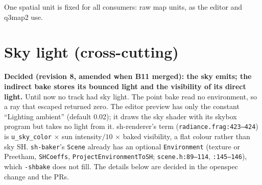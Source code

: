 \documentclass[11pt,a4paper]{article}
\begin{document}
\vspace{4pt}
One spatial unit is fixed for all consumers: raw map units, as the editor and q3map2 use.

\section{Sky light (cross-cutting)}\label{sec:sky}

\textbf{Decided (revision 8, amended when B11 merged): the sky emits; the indirect bake stores its
bounced light and the visibility of its direct light.} Until now no track had sky light. The point bake read
no environment, so a ray that escaped returned zero. The editor preview has only the constant
``Lighting ambient'' (default 0.02); it draws the sky shader with its skybox program but takes no
light from it. sh-renderer's term (\texttt{radiance.frag:423--424}) is \texttt{u\_sky\_color}
$\times$ sun intensity$/10$ $\times$ baked visibility, a flat colour rather than sky SH.
\texttt{sh-baker}'s \texttt{Scene} already has an optional \texttt{Environment} (texture or
Preetham, \texttt{SHCoeffs}, \texttt{ProjectEnvironmentToSH}; \texttt{scene.h:89--114},
\texttt{:145--146}), which \texttt{-shbake} does not fill. The details below are decided in the
openspec change and the PRs.
\end{document}
